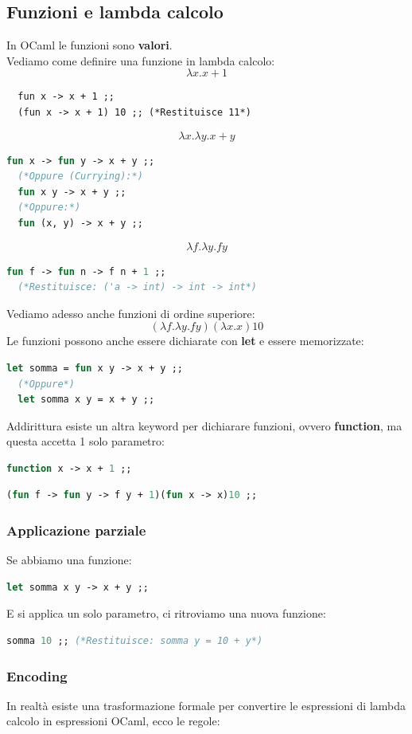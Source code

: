 \documentclass[12pt,a4paper]{article}
\begin{document}
\subsection{Funzioni e lambda calcolo}
In OCaml le funzioni sono \textbf{valori}.\\
Vediamo come definire una funzione in lambda calcolo:
\[
\lambda x.x + 1
\]
\begin{lstlisting}
  fun x -> x + 1 ;;
  (fun x -> x + 1) 10 ;; (*Restituisce 11*)
\end{lstlisting}
\[
\lambda x.\lambda y.x+y
\]
\begin{lstlisting}[language=OCaml]
  fun x -> fun y -> x + y ;;
  (*Oppure (Currying):*)
  fun x y -> x + y ;;
  (*Oppure:*)
  fun (x, y) -> x + y ;;
\end{lstlisting}
\[
\lambda f.\lambda y.fy
\]
\begin{lstlisting}[language=OCaml]
  fun f -> fun n -> f n + 1 ;;
  (*Restituisce: ('a -> int) -> int -> int*)
\end{lstlisting}
Vediamo adesso anche funzioni di ordine superiore:
\[
(\lambda f.\lambda y. fy)(\lambda x.x)10
\]
Le funzioni possono anche essere dichiarate con \textbf{let} e essere memorizzate:
\begin{lstlisting}[language=OCaml]
  let somma = fun x y -> x + y ;;
  (*Oppure*)
  let somma x y = x + y ;;
\end{lstlisting}
Addirittura esiste un altra keyword per dichiarare funzioni, ovvero \textbf{function}, ma questa accetta 1 solo parametro:
\begin{lstlisting}[language=OCaml]
  function x -> x + 1 ;;
\end{lstlisting}
\begin{lstlisting}[language=OCaml]
  (fun f -> fun y -> f y + 1)(fun x -> x)10 ;;
\end{lstlisting}
\subsubsection{Applicazione parziale}
Se abbiamo una funzione:
\begin{lstlisting}[language=OCaml]
  let somma x y -> x + y ;;
\end{lstlisting}
E si applica un solo parametro, ci ritroviamo una nuova funzione:
\begin{lstlisting}[language=OCaml]
  somma 10 ;; (*Restituisce: somma y = 10 + y*)
\end{lstlisting}
\subsubsection{Encoding}
In realtà esiste una trasformazione formale per convertire le espressioni di lambda calcolo in espressioni OCaml, ecco le regole:
\end{document}

